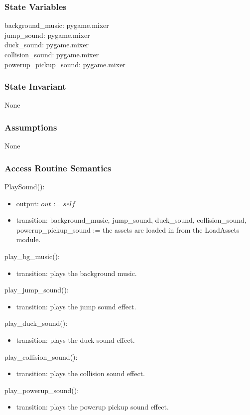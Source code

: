 \documentclass[12pt]{article}
\begin{document}
\subsubsection* {State Variables}

background\_music: pygame.mixer\\
jump\_sound: pygame.mixer\\
duck\_sound: pygame.mixer\\
collision\_sound: pygame.mixer\\
powerup\_pickup\_sound: pygame.mixer 

\subsubsection* {State Invariant}

None

\subsubsection* {Assumptions}

None

\subsubsection* {Access Routine Semantics}

PlaySound():
\begin{itemize}
    \item output: $out$ := $self$
    \item transition: background\_music, jump\_sound, duck\_sound, collision\_sound, powerup\_pickup\_sound := the assets are loaded in from the LoadAssets module.
\end{itemize}
\noindent  play\_bg\_music():
\begin{itemize}
    \item transition: plays the background music.
\end{itemize}
\noindent play\_jump\_sound():
\begin{itemize}
    \item transition: plays the jump sound effect.
\end{itemize}
\noindent  play\_duck\_sound():
\begin{itemize}
    \item transition: plays the duck sound effect.
\end{itemize}
\noindent  play\_collision\_sound():
\begin{itemize}
    \item transition: plays the collision sound effect.
\end{itemize}
\noindent  play\_powerup\_sound():
\begin{itemize}
    \item transition: plays the powerup pickup sound effect.
\end{itemize}
\newpage
\end{document}

